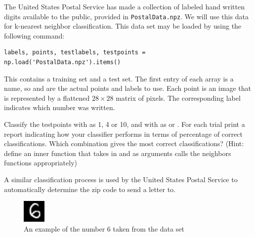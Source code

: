 \begin{problem} %
The United States Postal Service has made a collection of labeled hand written digits available to the public, provided in \texttt{PostalData.npz}.
We will use this data for k-nearest neighbor classification.
This data set may be loaded by using the following command:

\begin{lstlisting}
labels, points, testlabels, testpoints = np.load('PostalData.npz').items()
\end{lstlisting}

This contains a training set and a test set.
The first entry of each array is a name, so  and  are the actual points and labels to use.
Each point is an image that is represented by a flattened $28 \times 28$ matrix of pixels.
The corresponding label indicates which number was written.

Classify the testpoints with  as 1, 4 or 10, and with  as  or .
For each trial print a report indicating how your classifier performs in terms of percentage of correct classifications.
Which combination gives the most correct classifications?
(Hint: define an inner function that takes in  and  as arguments calls the neighbors functions appropriately)

A similar classification process is used by the United States Postal Service to automatically determine the zip code to send a letter to.

\begin{figure}[H]
\includegraphics[width=.25\textwidth]{figures/Example.pdf}
\caption{An example of the number 6 taken from the data set}
\end{figure}
\end{problem}

